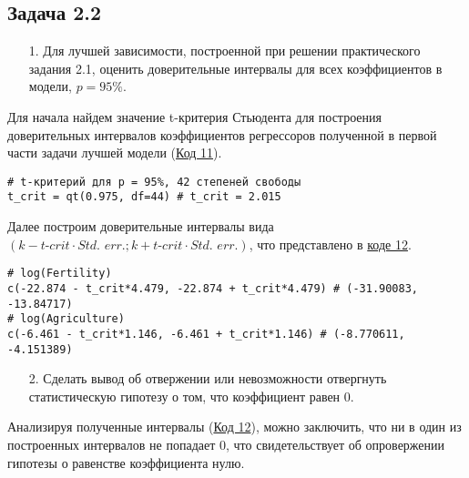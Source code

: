 \subsection{Задача 2.2}

\begin{enumerate}
    \item[1.] Для лучшей зависимости, построенной при решении практического задания 2.1, оценить доверительные интервалы для всех коэффициентов в модели, $p = 95\%$.
\end{enumerate}

Для начала найдем значение t-критерия Стьюдента для построения доверительных интервалов коэффициентов регрессоров полученной в первой части задачи лучшей  модели (\hyperref[code:11]{Код 11}).

\begin{code}
\begin{verbatim}
# t-критерий для p = 95%, 42 степеней свободы
t_crit = qt(0.975, df=44) # t_crit = 2.015
\end{verbatim}
\label{code:11}
\end{code}

Далее построим доверительные интервалы вида ${(k - \textit{t-crit} \cdot \textit{Std. err.}; k + \textit{t-crit} \cdot \textit{Std. err.})}$, что представлено в \hyperref[code:12]{коде 12}.

\begin{code}
\begin{verbatim}
# log(Fertility)
c(-22.874 - t_crit*4.479, -22.874 + t_crit*4.479) # (-31.90083, -13.84717)
# log(Agriculture)
c(-6.461 - t_crit*1.146, -6.461 + t_crit*1.146) # (-8.770611, -4.151389)
\end{verbatim}
\label{code:12}
\end{code}

\begin{enumerate}
    \item[2.] Сделать вывод об отвержении или невозможности отвергнуть статистическую гипотезу о том, что коэффициент равен 0.
\end{enumerate}

Анализируя полученные интервалы (\hyperref[code:12]{Код 12}), можно заключить, что ни в один из построенных интервалов не попадает 0, что свидетельствует об опровержении гипотезы о равенстве коэффициента нулю.

